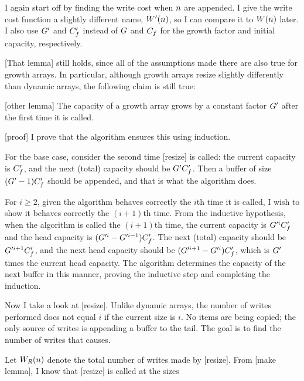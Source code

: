 \groarrayimpl

\tcomplex

I again start off by finding the write cost when $n$ are appended. I give the write cost function a slightly different name, $W'(n)$, so I can compare it to $W(n)$ later. I also use $G'$ and $C_f'$ instead of $G$ and $C_f$ for the growth factor and initial capacity, respectively.

[That lemma] still holds, since all of the assumptions made there are also true for growth arrays. In particular, although growth arrays resize slightly differently than dynamic arrays, the following claim is still true:

[other lemma]
The capacity of a growth array grows by a constant factor $G'$ after the first time it is called.

[proof]
I prove that the algorithm ensures this using induction.

For the base case, consider the second time [resize] is called: the current capacity is $C_f'$, and the next (total) capacity should be $G'C_f'$. Then a buffer of size $(G' - 1)C_f'$ should be appended, and that is what the algorithm does.

For $i \geq 2$, given the algorithm behaves correctly the $i$th time it is called, I wish to show it behaves correctly the $(i + 1)$th time. From the inductive hypothesis, when the algorithm is called the $(i + 1)$th time, the current capacity is $G'^iC_f'$ and the head capacity is $(G'^i - G'^{i - 1})C_f'$. The next (total) capacity should be $G'^{i + 1}C_f'$, and the next head capacity should be $(G'^{i + 1} - G'^i)C_f'$, which is $G'$ times the current head capacity. The algorithm determines the capacity of the next buffer in this manner, proving the inductive step and completing the induction.

Now I take a look at [resize]. Unlike dynamic arrays, the number of writes performed does not equal $i$ if the current size is $i$. No items are being copied; the only source of writes is appending a buffer to the tail. The goal is to find the number of writes that causes.

Let $W_R(n)$ denote the total number of writes made by [resize]. From [make lemma], I know that [resize] is called at the sizes

